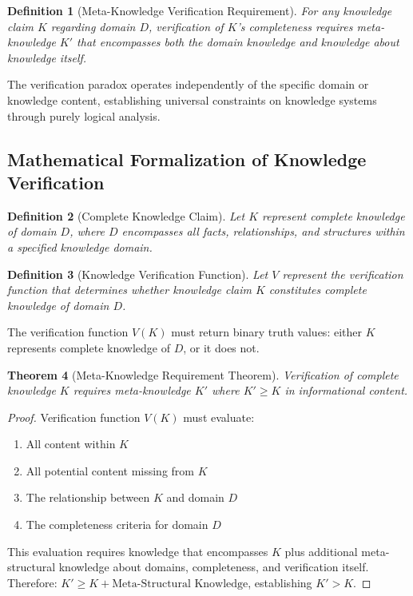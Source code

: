 \documentclass[12pt,a4paper]{article}
\newtheorem{theorem}{Theorem}[section]
\newtheorem{definition}[theorem]{Definition}
\begin{document}
\begin{definition}[Meta-Knowledge Verification Requirement]
For any knowledge claim $K$ regarding domain $D$, verification of $K$'s completeness requires meta-knowledge $K'$ that encompasses both the domain knowledge and knowledge about knowledge itself.
\end{definition}

The verification paradox operates independently of the specific domain or knowledge content, establishing universal constraints on knowledge systems through purely logical analysis.

\subsection{Mathematical Formalization of Knowledge Verification}

\begin{definition}[Complete Knowledge Claim]
Let $K$ represent complete knowledge of domain $D$, where $D$ encompasses all facts, relationships, and structures within a specified knowledge domain.
\end{definition}

\begin{definition}[Knowledge Verification Function]
Let $V$ represent the verification function that determines whether knowledge claim $K$ constitutes complete knowledge of domain $D$.
\end{definition}

The verification function $V(K)$ must return binary truth values: either $K$ represents complete knowledge of $D$, or it does not.

\begin{theorem}[Meta-Knowledge Requirement Theorem]
Verification of complete knowledge $K$ requires meta-knowledge $K'$ where $K' \geq K$ in informational content.
\end{theorem}

\begin{proof}
Verification function $V(K)$ must evaluate:
\begin{enumerate}
\item All content within $K$
\item All potential content missing from $K$ 
\item The relationship between $K$ and domain $D$
\item The completeness criteria for domain $D$
\end{enumerate}

This evaluation requires knowledge that encompasses $K$ plus additional meta-structural knowledge about domains, completeness, and verification itself. Therefore: $K' \geq K + \text{Meta-Structural Knowledge}$, establishing $K' > K$.
\end{proof}
\end{document}
